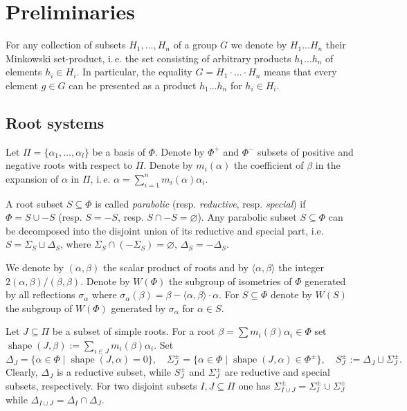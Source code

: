 \documentclass[12pt]{amsart}
\numberwithin{equation}{section}
\theoremstyle{definition}
\DeclareMathOperator{\shape}{shape}
\begin{document}
\section{Preliminaries}\label{sec:prelim}
For any collection of subsets $H_1,\ldots, H_n$ of a group $G$ we denote by $H_1\ldots H_n$ their Minkowski set-product,
i.\,e. the set consisting of arbitrary products $h_1\ldots h_n$ of elements $h_i\in H_i$. In particular, the equality
$G = H_1\cdot\ldots\cdot H_n$ means that every element $g\in G$ can be presented as a product $h_1\ldots h_n$ for $h_i\in H_i$.

\subsection{Root systems}\label{sec:rootsys}
Let $\Pi=\{\alpha_1, \ldots, \alpha_l\}$ be a basis of $\Phi$. Denote by $\Phi^+$ and $\Phi^-$ subsets of positive and negative roots with respect to $\Pi$.
Denote by $m_i(\alpha)$ the coefficient of $\beta$ in the expansion of $\alpha$ in $\Pi$, i.\,e. $\alpha = \sum_{i=1}^n m_i(\alpha) \alpha_i$.

A root subset $S\subseteq \Phi$ is called {\it parabolic} (resp. {\it reductive}, resp. {\it special}) if $\Phi=S \cup -S$ (resp. $S = -S$, resp. $S \cap -S=\varnothing$).
Any parabolic subset $S \subseteq \Phi$ can be decomposed into the disjoint union of its reductive and special part, i.e. 
$S = \Sigma_S \sqcup \Delta_S$, where $\Sigma_S \cap (-\Sigma_S) = \varnothing$, $\Delta_S = -\Delta_S$.

We denote by $(\alpha, \beta)$ the scalar product of roots and by $\langle \alpha, \beta\rangle$ the integer $2(\alpha, \beta)/(\beta, \beta)$.
Denote by $W(\Phi)$ the subgroup of isometries of $\Phi$ generated by all reflections $\sigma_\alpha$ where $\sigma_\alpha(\beta)=\beta-\langle\alpha,\beta \rangle\cdot \alpha$.
For $S\subseteq \Phi$ denote by $W(S)$ the subgroup of $W(\Phi)$ generated by $\sigma_\alpha$ for $\alpha\in S$.

Let $J\subseteq \Pi$ be a subset of simple roots. 
For a root $\beta = \sum m_i(\beta)\alpha_i \in \Phi$ set $\shape(J, \beta):=\sum\limits_{i\in J} m_i(\beta) \alpha_i$.
Set $$\Delta_J = \{\alpha \in \Phi \mid \shape(J, \alpha)=0\},\quad \Sigma^\pm_J = \{\alpha \in \Phi \mid \shape(J, \alpha)\in\Phi^\pm \}, \quad S_J^\pm := \Delta_J \sqcup \Sigma_J^\pm.$$
Clearly, $\Delta_J$ is a reductive subset, while $S^\pm_J$ and $\Sigma^\pm_J$ are reductive and special subsets, respectively.
For two disjoint subsets $I, J\subseteq \Pi$ one has $\Sigma^\pm_{I \cup J} = \Sigma^\pm_I\cup\Sigma^\pm_J$ while $\Delta_{I\cup J} = \Delta_I \cap \Delta_J$.
\end{document}
